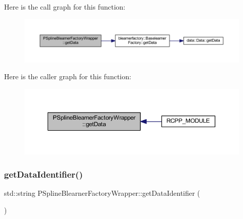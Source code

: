 Here is the call graph for this function\+:\nopagebreak
\begin{figure}[H]
\begin{center}
\leavevmode
\includegraphics[width=350pt]{class_p_spline_blearner_factory_wrapper_a7613c56ca05f36f8365a1d5987bbf823_cgraph}
\end{center}
\end{figure}
Here is the caller graph for this function\+:\nopagebreak
\begin{figure}[H]
\begin{center}
\leavevmode
\includegraphics[width=350pt]{class_p_spline_blearner_factory_wrapper_a7613c56ca05f36f8365a1d5987bbf823_icgraph}
\end{center}
\end{figure}
\mbox{\label{class_p_spline_blearner_factory_wrapper_a909646ea1efe420d71c8159ab2305fc8}} 
\subsubsection{\texorpdfstring{get\+Data\+Identifier()}{getDataIdentifier()}}
{\footnotesize\ttfamily std\+::string P\+Spline\+Blearner\+Factory\+Wrapper\+::get\+Data\+Identifier (\begin{DoxyParamCaption}{ }\end{DoxyParamCaption})\hspace{0.3cm}{\ttfamily [inline]}}

